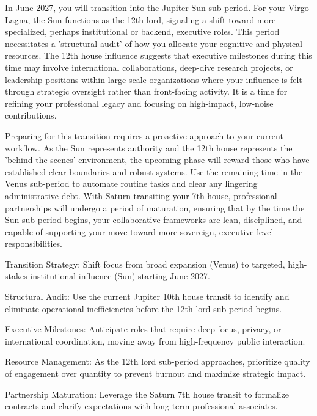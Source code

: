 {\fontsize{9}{13}\selectfont In June 2027, you will transition into the Jupiter-Sun sub-period. For your Virgo Lagna, the Sun functions as the 12th lord, signaling a shift toward more specialized, perhaps institutional or backend, executive roles. This period necessitates a 'structural audit' of how you allocate your cognitive and physical resources. The 12th house influence suggests that executive milestones during this time may involve international collaborations, deep-dive research projects, or leadership positions within large-scale organizations where your influence is felt through strategic oversight rather than front-facing activity. It is a time for refining your professional legacy and focusing on high-impact, low-noise contributions.}\par\vspace{1.8mm}

{\fontsize{9}{13}\selectfont Preparing for this transition requires a proactive approach to your current workflow. As the Sun represents authority and the 12th house represents the 'behind-the-scenes' environment, the upcoming phase will reward those who have established clear boundaries and robust systems. Use the remaining time in the Venus sub-period to automate routine tasks and clear any lingering administrative debt. With Saturn transiting your 7th house, professional partnerships will undergo a period of maturation, ensuring that by the time the Sun sub-period begins, your collaborative frameworks are lean, disciplined, and capable of supporting your move toward more sovereign, executive-level responsibilities.}\par\vspace{1.8mm}

\begin{diamondlist}
  \item {\fontsize{8.5}{12}\selectfont Transition Strategy: Shift focus from broad expansion (Venus) to targeted, high-stakes institutional influence (Sun) starting June 2027.}
  \item {\fontsize{8.5}{12}\selectfont Structural Audit: Use the current Jupiter 10th house transit to identify and eliminate operational inefficiencies before the 12th lord sub-period begins.}
  \item {\fontsize{8.5}{12}\selectfont Executive Milestones: Anticipate roles that require deep focus, privacy, or international coordination, moving away from high-frequency public interaction.}
  \item {\fontsize{8.5}{12}\selectfont Resource Management: As the 12th lord sub-period approaches, prioritize quality of engagement over quantity to prevent burnout and maximize strategic impact.}
  \item {\fontsize{8.5}{12}\selectfont Partnership Maturation: Leverage the Saturn 7th house transit to formalize contracts and clarify expectations with long-term professional associates.}
\end{diamondlist}


